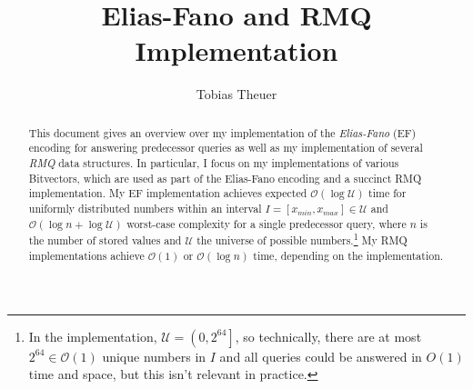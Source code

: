 \documentclass[a4paper,UKenglish,cleveref, autoref, thm-restate]{lipics-v2021}
\title{Elias-Fano and RMQ Implementation} %
\author{Tobias Theuer}{KIT, Germany}{ufevn@student.kit.edu}{}{}%
\newcommand{\stress}[1] {\textit{#1}}
\newcommand{\select} {\texttt{select}}
\begin{document}
\maketitle

\begin{abstract}
This document gives an overview over my implementation of the \stress{Elias-Fano} (EF) encoding \cite{elias} \cite{fano} \cite{folien}
for answering predecessor queries as well as my implementation of several \stress{RMQ} data structures.
In particular, I focus on my implementations of various Bitvectors,
which are used as part of the Elias-Fano encoding and a succinct RMQ implementation.
My EF implementation achieves expected $\mathcal{O}(\log \mathcal U)$ time for uniformly distributed numbers
within an interval $I = [x_{min}, x_{max}] \in \mathcal U$
and $\mathcal{O}(\log n + \log \mathcal U)$ worst-case complexity for a single predecessor query,
where $n$ is the number of stored values and $\mathcal U$ the universe of possible numbers.\footnote{In the implementation,
$\mathcal U = \left(0, 2^{64}\right]$, so technically, there are at most $2^{64} \in \mathcal{O}(1)$ unique numbers in $I$ and all queries
could be answered in $O(1)$ time and space, but this isn't relevant in practice.}
My RMQ implementations achieve $\mathcal O(1)$ or $\mathcal O(\log n)$ time, depending on the implementation.

\end{abstract}

\newpage



\end{document}
